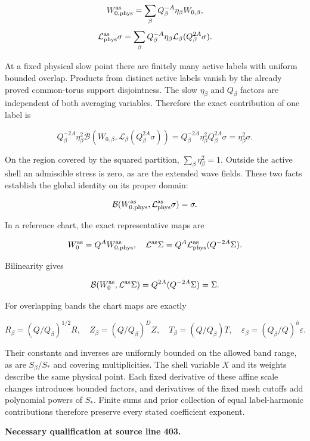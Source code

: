 \documentclass[10pt,a4paper]{article}
\begin{document}
\[
W_{0,\mathrm{phys}}^{\rm as}
=\sum_\beta Q_\beta^{-A}\eta_\beta W_{0,\beta},
\] \[
\mathcal L_{\mathrm{phys}}^{\rm as}\sigma
=\sum_\beta Q_\beta^{-A}\eta_\beta
\mathcal L_\beta(Q_\beta^{2A}\sigma).
\]

At a fixed physical slow point there are finitely many active labels with uniform bounded overlap. Products from distinct active labels vanish by the already proved common-torus support disjointness. The slow \(\eta_\beta\) and \(Q_\beta\) factors are independent of both averaging variables. Therefore the exact contribution of one label is

\[
Q_\beta^{-2A}\eta_\beta^2
\mathcal B(W_{0,\beta},\mathcal L_\beta(Q_\beta^{2A}\sigma))
=Q_\beta^{-2A}\eta_\beta^2Q_\beta^{2A}\sigma
=\eta_\beta^2\sigma.
\]

On the region covered by the squared partition, \(\sum_\beta\eta_\beta^2=1\). Outside the active shell an admissible stress is zero, as are the extended wave fields. These two facts establish the global identity on its proper domain:

\[
\mathcal B(W_{0,\mathrm{phys}}^{\rm as},
\mathcal L_{\mathrm{phys}}^{\rm as}\sigma)=\sigma.
\]

In a reference chart, the exact representative maps are

\[
W_0^{\rm as}=Q^AW_{0,\mathrm{phys}}^{\rm as},
\quad
\mathcal L^{\rm as}\Sigma
=Q^A\mathcal L_{\mathrm{phys}}^{\rm as}(Q^{-2A}\Sigma).
\]

Bilinearity gives

\[
\mathcal B(W_0^{\rm as},\mathcal L^{\rm as}\Sigma)
=Q^{2A}(Q^{-2A}\Sigma)=\Sigma.
\]

For overlapping bands the chart maps are exactly

\[
R_\beta=(Q/Q_\beta)^{1/2}R,\quad
Z_\beta=(Q/Q_\beta)^DZ,\quad
T_\beta=(Q/Q_\beta)T,
\quad \varepsilon_\beta=(Q_\beta/Q)^h\varepsilon.
\]

Their constants and inverses are uniformly bounded on the allowed band range, as are \(S_\beta/S_*\) and covering multiplicities. The shell variable \(X\) and its weights describe the same physical point. Each fixed derivative of these affine scale changes introduces bounded factors, and derivatives of the fixed mesh cutoffs add polynomial powers of \(S_*\). Finite sums and prior collection of equal label-harmonic contributions therefore preserve every stated coefficient exponent.

\textbf{Necessary qualification at source line 403.}
\end{document}
